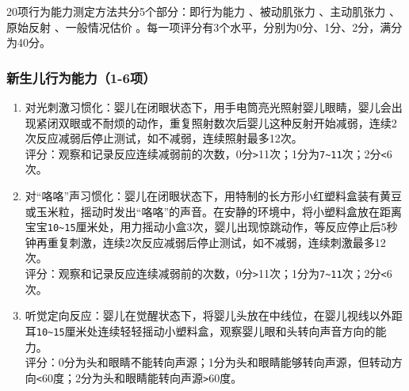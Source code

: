 20项行为能力测定方法共分5个部分：即行为能力%
、被动肌张力%
、主动肌张力%
、原始反射%
、一般情况估价%
。每一项评分有3个水平，分别为0分、1分、2分，满分为40分。

\subsubsection{新生儿行为能力（1-6项）}%


\begin{enumerate}
\item
  对光刺激习惯化：婴儿在闭眼状态下，用手电筒亮光照射婴儿眼睛，婴儿会出现紧闭双眼或不耐烦的动作，重复照射数次后婴儿这种反射开始减弱，连续2次反应减弱后停止测试，如不减弱，连续照射最多12次。\\
  评分：观察和记录反应连续减弱前的次数，0分\texttt{\textgreater{}}\hspace{0pt}11次；1分为\texttt{7\textasciitilde{}11}\hspace{0pt}次；2分\texttt{\textless{}}\hspace{0pt}6次。
\item
  对``咯咯''声习惯化：婴儿在闭眼状态下，用特制的长方形小红塑料盒装有黄豆或玉米粒，摇动时发出``咯咯''的声音。在安静的环境中，将小塑料盒放在距离宝宝\texttt{10\textasciitilde{}15}\hspace{0pt}厘米处，用力摇动小盒3次，婴儿出现惊跳动作，等反应停止后5秒钟再重复刺激，连续2次反应减弱后停止测试，如不减弱，连续刺激最多12次。\\
  评分：观察和记录反应连续减弱前的次数，0分\texttt{\textgreater{}}\hspace{0pt}11次；1分为\texttt{7\textasciitilde{}11}\hspace{0pt}次；2分\texttt{\textless{}}\hspace{0pt}6次。
\item
  听觉定向反应：婴儿在觉醒状态下，将婴儿头放在中线位，在婴儿视线以外距耳\texttt{10\textasciitilde{}15}\hspace{0pt}厘米处连续轻轻摇动小塑料盒，观察婴儿眼和头转向声音方向的能力。\\
  评分：0分为头和眼睛不能转向声源；1分为头和眼睛能够转向声源，但转动方向\texttt{\textless{}}\hspace{0pt}60度；2分为头和眼睛能转向声源\texttt{\textgreater{}}\hspace{0pt}60度。

\end{enumerate}
